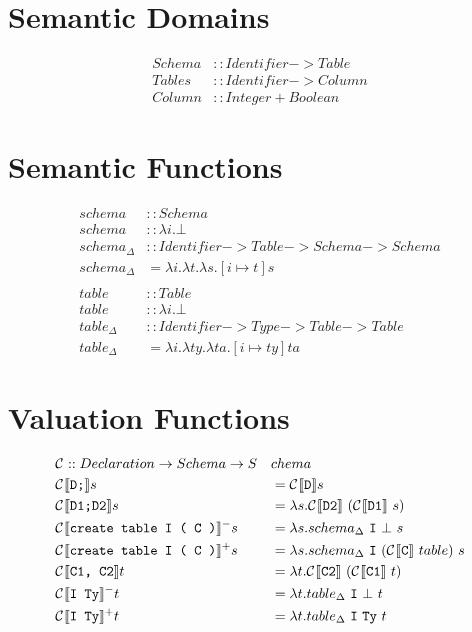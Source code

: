 \documentclass[12pt]{article}
\begin{document}
\section{Semantic Domains}
\begin{align*}
  Schema &:: Identifier -> Table \\
  Tables &:: Identifier -> Column \\
  Column &:: Integer + Boolean
\end{align*}

\section{Semantic Functions}
\begin{align*}
  schema &:: Schema \\
  schema &:: \lambda i.\bot \\
  schema_{\Delta} &:: Identifier -> Table -> Schema -> Schema \\
  schema_{\Delta} &= \lambda i. \lambda t. \lambda s. [ i \mapsto t ]s \\
  \\
  table &:: Table \\
  table &:: \lambda i.\bot \\
  table_{\Delta} &:: Identifier -> Type -> Table -> Table \\
  table_{\Delta} &= \lambda i. \lambda ty. \lambda ta. [ i \mapsto ty ]ta
\end{align*}

\section{Valuation Functions}

\begin{alignat*}{2}
  &\compsymbol :: Declaration -> Schema -> S&&chema \\
  &\comp{D;}{}s &&= \comp{D}{}s \\
  &\comp{D1;D2}{}s &&= \lambda s.\comp{D2}{}\ (\comp{D1}{}\ s) \\
  &\comp{create table I ( C )}{}^{-}s &&= \lambda s. schema_{\Delta}\ \mathtt{I}\ \bot\ s \\
  &\comp{create table I ( C )}{}^{+}s &&= \lambda s. schema_{\Delta}\ \mathtt{I}\ (\comp{C}{}\ table)\ s \\
  &\comp{C1, C2}{}t &&= \lambda t.\comp{C2}{}\ (\comp{C1}{}\ t) \\
  &\comp{I Ty}{}^{-}t &&= \lambda t.table_{\Delta}\ \mathtt{I}\ \bot\ t \\
  &\comp{I Ty}{}^{+}t &&= \lambda t.table_{\Delta}\ \mathtt{I}\ \mathtt{Ty}\ t \\
\end{alignat*}
\end{document}
